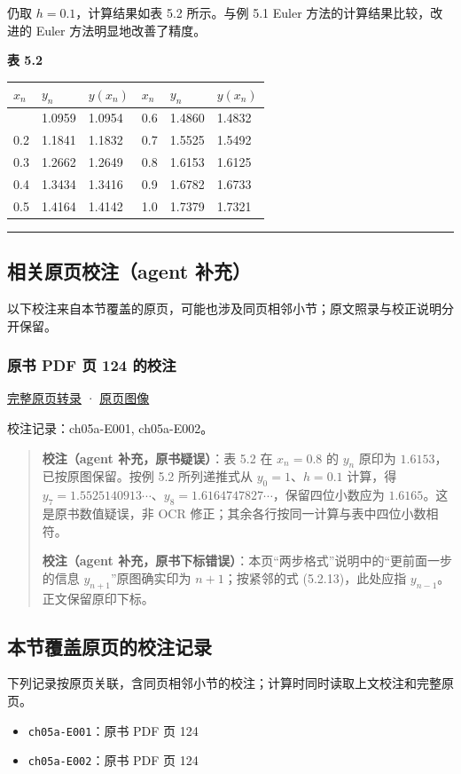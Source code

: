 \documentclass[
  10pt,
  fontset=fandol]{ctexart}
\newcounter{none} %
\providecommand{\tightlist}{%
  \setlength{\itemsep}{0pt}\setlength{\parskip}{0pt}}
\begin{document}
仍取 \(h=0.1\)，计算结果如表 5.2 所示。与例 5.1 Euler 方法的计算结果比较，改进的 Euler 方法明显地改善了精度。

\textbf{表 5.2}

{\def\LTcaptype{none} %
\begin{longtable}[]{@{}llllll@{}}
\toprule\noalign{}
\(x_n\) & \(y_n\) & \(y(x_n)\) & \(x_n\) & \(y_n\) & \(y(x_n)\) \\
\midrule\noalign{}
\endhead
\bottomrule\noalign{}
\endlastfoot
0.1 & 1.0959 & 1.0954 & 0.6 & 1.4860 & 1.4832 \\
0.2 & 1.1841 & 1.1832 & 0.7 & 1.5525 & 1.5492 \\
0.3 & 1.2662 & 1.2649 & 0.8 & 1.6153 & 1.6125 \\
0.4 & 1.3434 & 1.3416 & 0.9 & 1.6782 & 1.6733 \\
0.5 & 1.4164 & 1.4142 & 1.0 & 1.7379 & 1.7321 \\
\end{longtable}
}

\begin{center}\rule{0.5\linewidth}{0.5pt}\end{center}

\subsection{相关原页校注（agent 补充）}\label{ux76f8ux5173ux539fux9875ux6821ux6ce8agent-ux8865ux5145}

以下校注来自本节覆盖的原页，可能也涉及同页相邻小节；原文照录与校正说明分开保留。

\subsubsection{原书 PDF 页 124 的校注}\label{ux539fux4e66-pdf-ux9875-124-ux7684ux6821ux6ce8}

\href{../pages/pdf-124.md}{完整原页转录} · \href{../../source-images/pdf-124.jpeg}{原页图像}

校注记录：ch05a-E001, ch05a-E002。

\begin{quote}
\textbf{校注（agent 补充，原书疑误）}：表 5.2 在 \(x_n=0.8\) 的 \(y_n\) 原印为 \(1.6153\)，已按原图保留。按例 5.2 所列递推式从 \(y_0=1\)、\(h=0.1\) 计算，得 \(y_7=1.5525140913\cdots\)、\(y_8=1.6164747827\cdots\)，保留四位小数应为 \(1.6165\)。这是原书数值疑误，非 OCR 修正；其余各行按同一计算与表中四位小数相符。

\textbf{校注（agent 补充，原书下标错误）}：本页``两步格式''说明中的``更前面一步的信息 \(y_{n+1}\)''原图确实印为 \(n+1\)；按紧邻的式 (5.2.13)，此处应指 \(y_{n-1}\)。正文保留原印下标。
\end{quote}

\subsection{本节覆盖原页的校注记录}\label{ux672cux8282ux8986ux76d6ux539fux9875ux7684ux6821ux6ce8ux8bb0ux5f55}

下列记录按原页关联，含同页相邻小节的校注；计算时同时读取上文校注和完整原页。

\begin{itemize}
\tightlist
\item
  \texttt{ch05a-E001}：原书 PDF 页 124
\item
  \texttt{ch05a-E002}：原书 PDF 页 124
\end{itemize}
\end{document}
